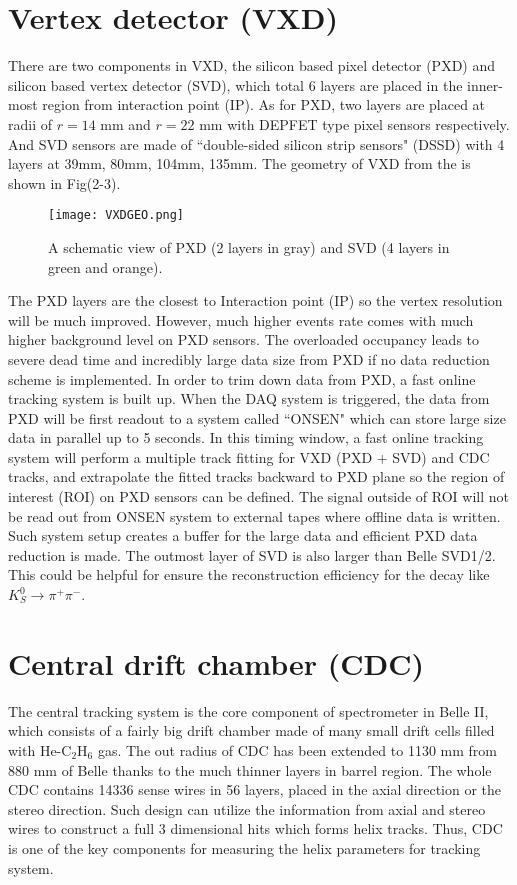 \section{Vertex detector (VXD)}
There are two components in VXD, the silicon based pixel detector (PXD) and silicon based vertex detector (SVD), which total 6 layers are placed in the inner-most region from interaction point (IP). As for PXD, two layers are placed at radii of $r=14$ mm and $r=22$ mm with DEPFET type pixel sensors respectively. And SVD sensors are made of ``double-sided silicon strip sensors" (DSSD) with 4 layers at 39mm, 80mm, 104mm, 135mm. The geometry of VXD from the is shown in Fig(2-3). 
\begin{figure}[H]
	\centering
	\texttt{[image: VXDGEO.png]}
	\caption{A schematic view of PXD (2 layers in gray) and SVD (4 layers in green and orange).}
\end{figure}

The PXD layers are the closest to Interaction point (IP) so the vertex resolution will be much improved. However, much higher events rate comes with much higher background level on PXD sensors. The overloaded occupancy leads to severe dead time and incredibly large data size from PXD if no data reduction scheme is implemented. In order to trim down data from PXD, a fast online tracking system is built up. When the DAQ system is triggered, the data from PXD will be first readout to a system called ``ONSEN" which can store large size data in parallel up to 5 seconds. In this timing window, a fast online tracking system will perform a multiple track fitting for VXD (PXD + SVD) and CDC tracks, and extrapolate the fitted tracks backward to PXD plane so the region of interest (ROI) on PXD sensors can be defined. The signal outside of ROI will not be read out from ONSEN system to external tapes where offline data is written. Such system setup creates a buffer for the large data and efficient PXD data reduction is made. The outmost layer of SVD is also larger than Belle SVD1/2. This could be helpful for ensure the reconstruction efficiency for the decay like $K_S^0 \to \pi^+ \pi^- $\cite{Abe:2010gxa}.

\section{Central drift chamber (CDC)}
The central tracking system is the core component of spectrometer in Belle II, which consists of a fairly big drift chamber made of many small drift cells filled with He-C$_2$H$_6$ gas. The out radius of CDC has been extended to 1130 mm from 880 mm of Belle thanks to the much thinner layers in barrel region. The whole CDC contains 14336 sense wires in 56 layers, placed in the axial direction or the stereo direction. Such design can utilize the information from axial and stereo wires to construct a full 3 dimensional hits which forms helix tracks. Thus, CDC is one of the key components for measuring the helix parameters for tracking system. 

